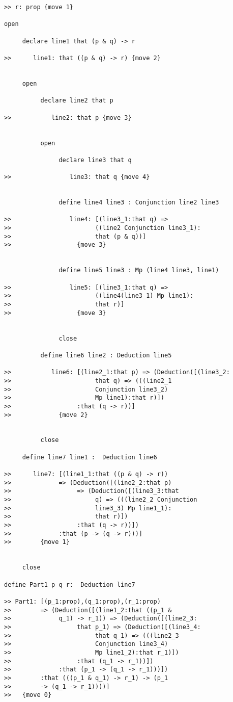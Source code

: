 \documentclass[12pt]{article}
\begin{document}
\begin{small}
\begin{verbatim}
>> r: prop {move 1}

open

     declare line1 that (p & q) -> r

>>      line1: that ((p & q) -> r) {move 2}


     open

          declare line2 that p

>>           line2: that p {move 3}


          open 

               declare line3 that q

>>                line3: that q {move 4}


               define line4 line3 : Conjunction line2 line3

>>                line4: [(line3_1:that q) => 
>>                       ((line2 Conjunction line3_1):
>>                       that (p & q))]
>>                  {move 3}


               define line5 line3 : Mp (line4 line3, line1)

>>                line5: [(line3_1:that q) => 
>>                       ((line4(line3_1) Mp line1):
>>                       that r)]
>>                  {move 3}


               close

          define line6 line2 : Deduction line5

>>           line6: [(line2_1:that p) => (Deduction([(line3_2:
>>                       that q) => (((line2_1 
>>                       Conjunction line3_2) 
>>                       Mp line1):that r)])
>>                  :that (q -> r))]
>>             {move 2}


          close

     define line7 line1 :  Deduction line6

>>      line7: [(line1_1:that ((p & q) -> r)) 
>>             => (Deduction([(line2_2:that p) 
>>                  => (Deduction([(line3_3:that 
>>                       q) => (((line2_2 Conjunction 
>>                       line3_3) Mp line1_1):
>>                       that r)])
>>                  :that (q -> r))])
>>             :that (p -> (q -> r)))]
>>        {move 1}


     close

define Part1 p q r:  Deduction line7

>> Part1: [(p_1:prop),(q_1:prop),(r_1:prop) 
>>        => (Deduction([(line1_2:that ((p_1 & 
>>             q_1) -> r_1)) => (Deduction([(line2_3:
>>                  that p_1) => (Deduction([(line3_4:
>>                       that q_1) => (((line2_3 
>>                       Conjunction line3_4) 
>>                       Mp line1_2):that r_1)])
>>                  :that (q_1 -> r_1))])
>>             :that (p_1 -> (q_1 -> r_1)))])
>>        :that (((p_1 & q_1) -> r_1) -> (p_1 
>>        -> (q_1 -> r_1))))]
>>   {move 0}



\end{verbatim}
\end{small}
\end{document}
